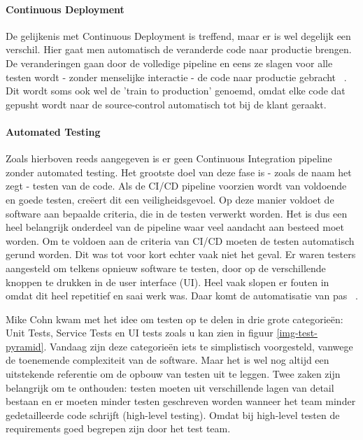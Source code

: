         \paragraph{Continuous Deployment}
        De gelijkenis met Continuous Deployment is treffend, maar er is wel degelijk een verschil.
        Hier gaat men automatisch de veranderde code naar productie brengen. De veranderingen gaan door de volledige pipeline en eens ze slagen voor alle testen wordt - zonder menselijke interactie - de code naar productie gebracht ~\autocite{Claps2015}.
        Dit wordt soms ook wel de 'train to production' genoemd, omdat elke code dat gepusht wordt naar de source-control automatisch tot bij de klant geraakt.
        
        \paragraph{Automated Testing}
        Zoals hierboven reeds aangegeven is er geen Continuous Integration pipeline zonder automated testing. Het grootste doel van deze fase is - zoals de naam het zegt - testen van de code. Als de CI/CD pipeline voorzien wordt van voldoende en goede testen, creëert dit een veiligheidsgevoel. Op deze manier voldoet de software aan bepaalde criteria, die in de testen verwerkt worden. Het is dus een heel belangrijk onderdeel van de pipeline waar veel aandacht aan besteed moet worden. 
        Om te voldoen aan de criteria van CI/CD moeten de testen automatisch gerund worden. Dit was tot voor kort echter vaak niet het geval. Er waren testers aangesteld om telkens opnieuw software te testen, door op de verschillende knoppen te drukken in de user interface (UI). Heel vaak slopen er fouten in omdat dit heel repetitief en saai werk was. Daar komt de automatisatie van pas ~\autocite{Vocke2018}.
        
        Mike Cohn kwam met het idee om testen op te delen in drie grote categorieën: Unit Tests, Service Tests en UI tests zoals u kan zien in figuur \ref{img-test-pyramid}.
        Vandaag zijn deze categorieën iets te simplistisch voorgesteld, vanwege de toenemende complexiteit van de software. Maar het is wel nog altijd een uitstekende referentie om de opbouw van testen uit te leggen.
        Twee zaken zijn belangrijk om te onthouden: testen moeten uit verschillende lagen van detail bestaan en er moeten minder testen geschreven worden wanneer het team minder gedetailleerde code schrijft (high-level testing). Omdat bij high-level testen de requirements goed begrepen zijn door het test team.
        

